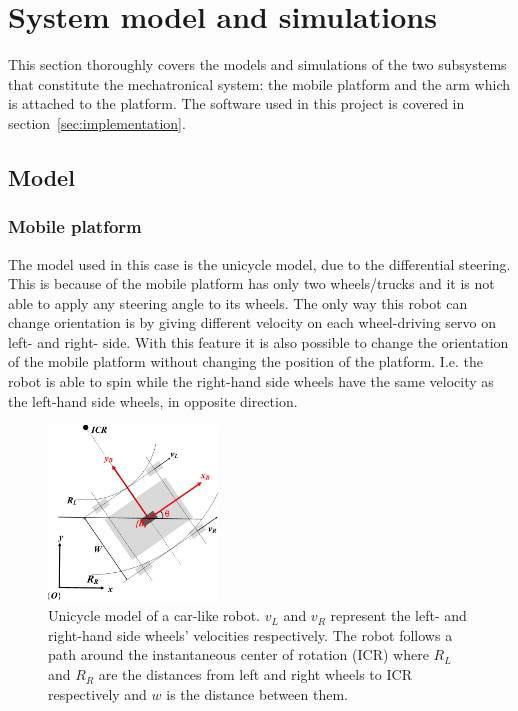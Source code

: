 \section{System model and simulations}
This section thoroughly covers the models and simulations of the two subsystems that constitute the mechatronical system:
the mobile platform and the arm which is attached to the platform.
The software used in this project is covered in section~\ref{sec:implementation}.

\subsection{Model}
\subsubsection{Mobile platform}
\label{subsubsec:unicycle}
The model used in this case is the unicycle model, due to the differential steering.
This is because of the mobile platform has only two wheels/trucks and it is not able to apply any steering angle to its wheels.
The only way this robot can change orientation is by giving different velocity on each wheel-driving servo on left- and right- side.
With this feature it is also possible to change the orientation of the mobile platform without changing the position of the platform.
I.e. the robot is able to spin while the right-hand side wheels have the same velocity as the left-hand side wheels, in opposite direction.
\begin{figure}[h]
\centering
\includegraphics[width=0.4\textwidth]{sections/assets/car-unicycle.png}
\caption{Unicycle model of a car-like robot.
$v_L$ and $v_R$ represent the left- and right-hand side wheels' velocities respectively.
The robot follows a path around the instantaneous center of rotation (ICR) where $R_L$ and $R_R$ are the distances from left and right wheels to ICR respectively and $w$ is the distance between them.}
\label{fig:UnicycleModel}
\end{figure}

